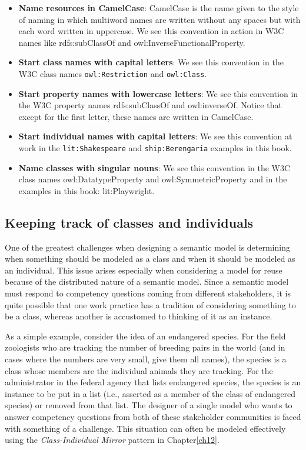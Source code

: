 \begin{itemize}
\item \textbf{Name resources in CamelCase}: CamelCase is the name given to the style of
naming in which multiword names are written without any spaces but with
each word written in uppercase. We see this convention in action in W3C
names like rdfs:subClassOf and owl:InverseFunctionalProperty.

\item \textbf{Start class names with capital letters}: We see this convention in the
W3C class names \texttt{owl:Restriction} and \texttt{owl:Class}.

\item \textbf{Start property names with lowercase letters}: We see this convention in
the W3C property names rdfs:subClassOf and owl:inverseOf. Notice that
except for the first letter, these names are written in CamelCase.

\item \textbf{Start individual names with capital letters}: We see this convention at
work in the
\texttt{lit:Shakespeare} and \texttt{ship:Berengaria} examples in this book.

\item \textbf{Name classes with singular nouns}: We see this convention in the W3C
class names owl:DatatypeProperty and owl:SymmetricProperty and in the
examples in this book: lit:Playwright.
\end{itemize}


\subsection{Keeping track of classes and individuals}
\label{metamodel}
One of the greatest challenges when designing a semantic model is
determining when something should be modeled as a class and when it
should be modeled as an individual. This issue arises especially when
considering a model for reuse because of the distributed nature of a
semantic model. Since a semantic model must respond to competency
questions coming from different stakeholders, it is quite possible that
one work practice has a tradition of considering something to be a
class, whereas another is accustomed to thinking of it as an instance.

As a simple example, consider the idea of an endangered species. For the
field zoologists who are
tracking the number of breeding pairs in the world (and in cases where
the numbers are very small, give them all names), the species is a class
whose members are the individual animals they are tracking. For the
administrator in the federal agency that lists endangered species, the
species is an instance to be put in a list (i.e., asserted as a member
of the class of endangered species) or removed from that list. The
designer of a single model who wants to answer competency questions from
both of these stakeholder communities is faced with something of a
challenge. This situation can often be modeled effectively using the
\emph{Class-Individual Mirror} pattern in Chapter\ref{ch12}.

